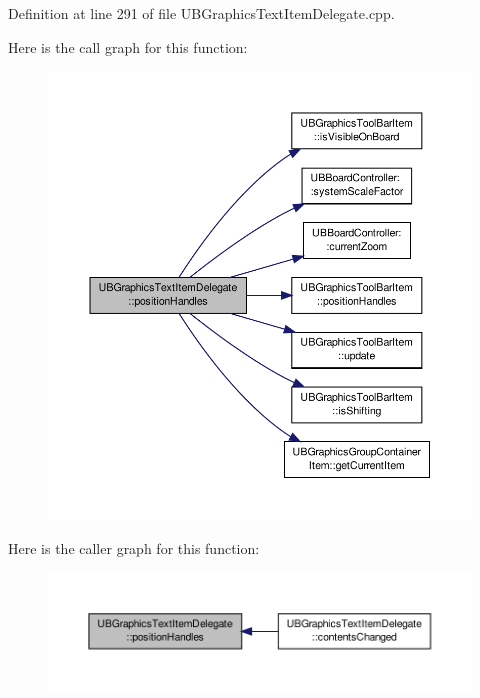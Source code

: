 Definition at line 291 of file U\-B\-Graphics\-Text\-Item\-Delegate.\-cpp.



Here is the call graph for this function\-:
\nopagebreak
\begin{figure}[H]
\begin{center}
\leavevmode
\includegraphics[width=350pt]{d9/dbd/class_u_b_graphics_text_item_delegate_a7ecdc3b3ed05e772714e7bb461de779f_cgraph}
\end{center}
\end{figure}




Here is the caller graph for this function\-:
\nopagebreak
\begin{figure}[H]
\begin{center}
\leavevmode
\includegraphics[width=350pt]{d9/dbd/class_u_b_graphics_text_item_delegate_a7ecdc3b3ed05e772714e7bb461de779f_icgraph}
\end{center}
\end{figure}


